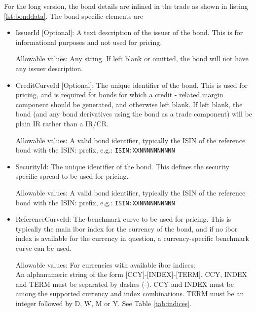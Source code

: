For the long version, the bond details are inlined in the trade as shown in listing \ref{lst:bonddata}. The bond specific elements are

\begin{itemize}
\item IssuerId [Optional]: A text description of the issuer of the bond.  This is for informational purposes and not used for pricing.

Allowable values: Any string. If left blank or omitted, the bond will not have any issuer description.

\item CreditCurveId [Optional]: The unique identifier of the bond. This is used for pricing, and is required for bonds for which a credit - related margin component should be generated, and otherwise left blank. If left blank, the bond (and any bond derivatives using the bond as a trade component) will be  plain IR rather than a IR/CR. 

Allowable values: A valid bond identifier, typically the ISIN of the reference bond with the ISIN: prefix, e.g.: \verb+ISIN:XXNNNNNNNNNN+

\item SecurityId: The unique identifier of the bond.  This defines the security specific spread to be used for pricing.

Allowable values: A valid bond identifier, typically the ISIN of the reference bond with the ISIN: prefix, e.g.: \verb+ISIN:XXNNNNNNNNNN+
  
\item ReferenceCurveId: The benchmark curve to be used for pricing. This is typically the main ibor index for the currency of the bond, and if no ibor index is available for the currency in question, a currency-specific benchmark curve can be used.

Allowable values: 
For currencies with available ibor indices: \\
An alphanumeric string of the form [CCY]-[INDEX]-[TERM]. CCY, INDEX and TERM must be separated by dashes (-). CCY and INDEX must be among the supported currency and index combinations. TERM must be an integer followed by D, W, M or Y. See Table \ref{tab:indices}. 


\end{itemize}
